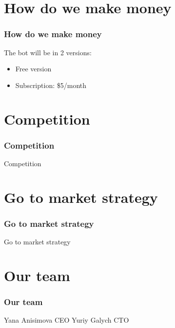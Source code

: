 \documentclass{beamer}
\begin{document}
\section{How do we make money}

\begin{frame}
    \frametitle{How do we make money}
    
    \begin{block}{The bot will be in 2 versions:}
        \begin{itemize}
            \item Free version
            \item Subscription: \$5/month
        \end{itemize}
    \end{block}
    
\end{frame}


\section{Competition}

\begin{frame}
    \frametitle{Competition}
    
    \begin{block}{Competition}
    \end{block}
    
\end{frame}

\section{Go to market strategy}

\begin{frame}
    \frametitle{Go to market strategy}
    
    \begin{block}{Go to market strategy}
    \end{block}
    
\end{frame}

\section{Our team}

\begin{frame}
    \frametitle{Our team}
    
    \begin{block}{}
        Yana Anisimova CEO 
        Yuriy Galych CTO
    \end{block}
    
\end{frame}
\end{document}
